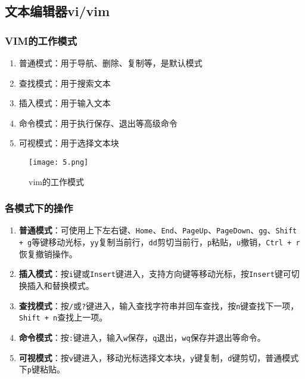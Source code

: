 \subsection{文本编辑器vi/vim}

\subsubsection{VIM的工作模式}
\begin{enumerate}
    \item 普通模式：用于导航、删除、复制等，是默认模式
    \item 查找模式：用于搜索文本
    \item 插入模式：用于输入文本
    \item 命令模式：用于执行保存、退出等高级命令
    \item 可视模式：用于选择文本块
\end{enumerate}

\begin{figure}[H]
    \centering
    \captionsetup{skip=4pt}
    \texttt{[image: 5.png]}
    \caption{vim的工作模式}
\end{figure}

\subsubsection{各模式下的操作}
\begin{enumerate}[label=\arabic*.]
    \item \textbf{普通模式}：可使用上下左右键、\texttt{Home}、\texttt{End}、\texttt{PageUp}、\texttt{PageDown}、\texttt{gg}、\texttt{Shift + g}等键移动光标，\texttt{yy}复制当前行，\texttt{dd}剪切当前行，\texttt{p}粘贴，\texttt{u}撤销，\texttt{Ctrl + r}恢复撤销操作。
    \item \textbf{插入模式}：按\texttt{i}键或\texttt{Insert}键进入，支持方向键等移动光标，按\texttt{Insert}键可切换插入和替换模式。
    \item \textbf{查找模式}：按\texttt{/}或\texttt{?}键进入，输入查找字符串并回车查找，按\texttt{n}键查找下一项，\texttt{Shift + n}查找上一项。
    \item \textbf{命令模式}：按\texttt{:}键进入，输入\texttt{w}保存，\texttt{q}退出，\texttt{wq}保存并退出等命令。
    \item \textbf{可视模式}：按\texttt{v}键进入，移动光标选择文本块，\texttt{y}键复制，\texttt{d}键剪切，普通模式下\texttt{p}键粘贴。
\end{enumerate}


